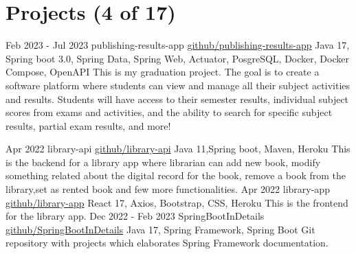\documentclass[letterpaper]{twentysecondcv} %
\begin{document}
\section{Projects (4 of 17)}
\begin{twenty} %
	\twentyitem
    		{Feb 2023 -}
		{Jul 2023}
        		{publishing-results-app}
        		{\href{https://github.com/SmartW0rker/publishing-results-app}{github/publishing-results-app}}
        		{Java 17, Spring boot 3.0, Spring Data, Spring Web, Actuator, PosgreSQL, Docker, Docker Compose, OpenAPI}
        		{\hspace*{1em}This is my graduation project. The goal is to create a software platform where students can view and manage all their subject activities and results. Students will have access to their semester results, individual subject scores from exams and activities, and the ability to search for specific subject results, partial exam results, and more!\vspace{1em}}

	\twentyitem
    		{Apr 2022}
		{}
        		{library-api}
        		{\href{https://github.com/SmartW0rker/library-api}{github/library-api}}
        		{Java 11,Spring boot, Maven, Heroku}
        		{This is the backend for a library app where librarian can add new book, modify something related about the digital record for the book, remove a book from the library,set as rented book and few more functionalities.\vspace{1em}}
	\twentyitem
    		{Apr 2022}
		{}
        		{library-app}
        		{\href{https://github.com/SmartW0rker/library-api}{github/library-app}}
        		{React 17, Axios, Bootstrap, CSS, Heroku}
        		{This is the frontend for the library app.\vspace{1em}}
	\twentyitem
    		{Dec 2022 -}
		{Feb 2023}
        		{SpringBootInDetails}
        		{\href{https://github.com/SmartW0rker/SpringBootInDetails}{github/SpringBootInDetails}}
        		{Java 17, Spring Framework, Spring Boot}
        		{Git repository with projects which elaborates Spring Framework documentation.}
                
\end{twenty}
\end{document}
